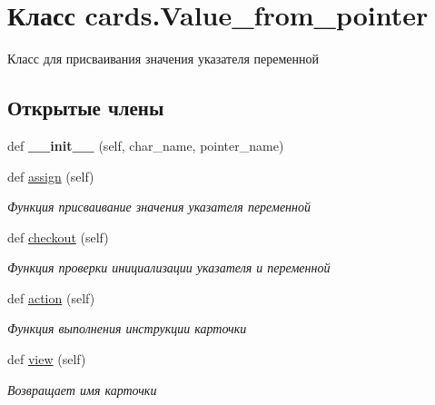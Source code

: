 \hypertarget{classcards_1_1_value__from__pointer}{}\section{Класс cards.\+Value\+\_\+from\+\_\+pointer}
\label{classcards_1_1_value__from__pointer}


Класс для присваивания значения указателя переменной  


\subsection*{Открытые члены}
\begin{DoxyCompactItemize}
\item 
\mbox{\label{classcards_1_1_value__from__pointer_aa82fbee9d94fda2e12bbbb9194a5d273}} 
def {\bfseries \+\_\+\+\_\+init\+\_\+\+\_\+} (self, char\+\_\+name, pointer\+\_\+name)
\item 
\mbox{\label{classcards_1_1_value__from__pointer_a4a1a82bc14462aa705d9d3181a8c077c}} 
def \mbox{\hyperlink{classcards_1_1_value__from__pointer_a4a1a82bc14462aa705d9d3181a8c077c}{assign}} (self)
\begin{DoxyCompactList}\small\item\em Функция присваивание значения указателя переменной \end{DoxyCompactList}\item 
\mbox{\label{classcards_1_1_value__from__pointer_a354fa2bbe2fc840600bb5951bf6f41cf}} 
def \mbox{\hyperlink{classcards_1_1_value__from__pointer_a354fa2bbe2fc840600bb5951bf6f41cf}{checkout}} (self)
\begin{DoxyCompactList}\small\item\em Функция проверки инициализации указателя и переменной \end{DoxyCompactList}\item 
def \mbox{\hyperlink{classcards_1_1_value__from__pointer_addb014665667632858e70bad8276c8a0}{action}} (self)
\begin{DoxyCompactList}\small\item\em Функция выполнения инструкции карточки \end{DoxyCompactList}\item 
def \mbox{\hyperlink{classcards_1_1_value__from__pointer_ab20c085652300a7b52408ed88c61acbc}{view}} (self)
\begin{DoxyCompactList}\small\item\em Возвращает имя карточки \end{DoxyCompactList}\end{DoxyCompactItemize}
